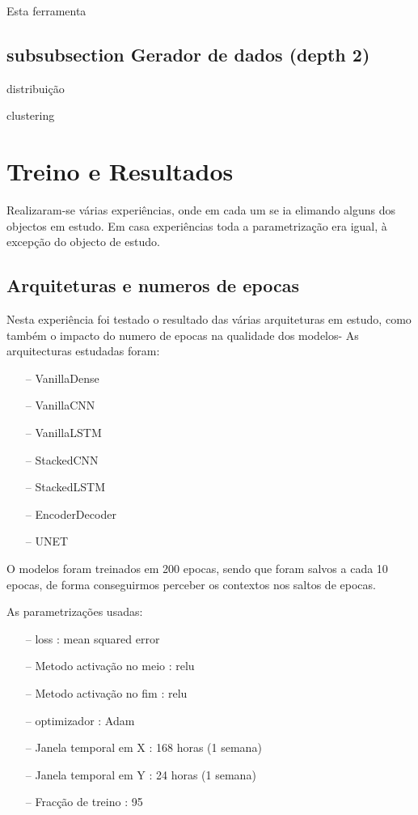 Esta ferramenta 

\subsection{subsubsection Gerador de dados (depth 2)}
distribuição

clustering


\section{Treino e Resultados  \label{se:training}}

Realizaram-se várias experiências, onde em cada um se ia elimando alguns dos objectos em estudo.
Em casa experiências toda a parametrização era igual, à excepção do objecto de estudo.

\subsection{Arquiteturas e numeros de epocas}

Nesta experiência foi testado o resultado das várias arquiteturas em estudo, como também o impacto do numero de epocas na qualidade dos modelos-
As arquitecturas estudadas foram:


\begin{itemize}
    \item[--] VanillaDense
    \item[--] VanillaCNN
    \item[--] VanillaLSTM
    \item[--] StackedCNN
    \item[--] StackedLSTM
    \item[--] EncoderDecoder
    \item[--] UNET
\end{itemize}

O modelos foram treinados em 200 epocas, sendo que foram salvos a cada 10 epocas, de forma conseguirmos perceber os contextos nos saltos de epocas.

As parametrizações usadas:
\begin{itemize}
    \item[--] loss : mean squared error
    \item[--] Metodo activação no meio : relu
    \item[--] Metodo activação no fim : relu
    \item[--] optimizador : Adam
    \item[--] Janela temporal em X : 168 horas (1 semana)
    \item[--] Janela temporal em Y : 24 horas (1 semana)
    \item[--] Fracção de treino : 95%
\end{itemize}

